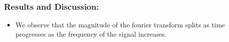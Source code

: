 \documentclass[10pt,a4paper]{article}
\providecommand{\tightlist}{%
      \setlength{\itemsep}{0pt}\setlength{\parskip}{0pt}}
\begin{document}
	

	

    \begin{center}
    \end{center}
    { \hspace*{\fill} \\}
    
	
		
    \subsubsection{Results and Discussion:}\label{results-and-discussion}

\begin{itemize}
\tightlist
\item
  We observe that the magnitude of the fourier transform splits as time
  progresses as the frequency of the signal increases.
\end{itemize}

	

	
		
	
	
		
	
		
			
		
	
		
			
		
	
		
			
		
	
		
			
		
	
		
			
		
	
		
			
		
	
		
			
		
	
		
			
		
	
		
			
		
	
		
			
		
	
		
			
		
	
		
			
		
	
		
			
		
	
		
			
		
	
		
			
\end{document}
